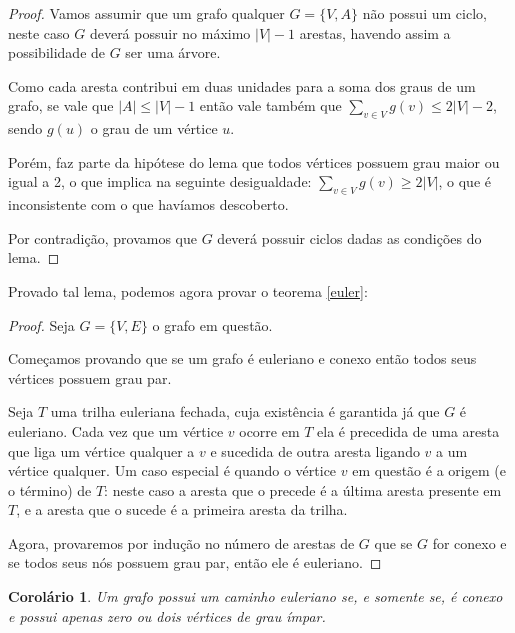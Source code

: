 \documentclass{article}
\newtheorem{corollary}{Corolário}
\begin{document}
\begin{proof}
	Vamos assumir que um grafo qualquer $G = \{V, A\}$ não possui um ciclo, neste caso $G$ deverá possuir no máximo $|V| - 1$ arestas, havendo assim a possibilidade de $G$ ser uma árvore. 
	
	Como cada aresta contribui em duas unidades para a soma dos graus de um grafo, se vale que $|A| \leq |V|-1$ então vale também que $\sum_{v \in V} g(v) \leq 2|V| - 2$, sendo $g(u)$ o grau de um vértice $u$. 

	Porém, faz parte da hipótese do lema que todos vértices possuem grau maior ou igual a 2, o que implica na seguinte desigualdade: $\sum_{v \in V}g(v) \geq 2|V|$, o que é inconsistente com o que havíamos descoberto.
	
	Por contradição, provamos que $G$ deverá possuir ciclos dadas as condições do lema.
\end{proof}


Provado tal lema, podemos agora provar o teorema \ref{euler}:

\begin{proof}

Seja $G = \{V, E\}$ o grafo em questão.

Começamos provando que se um grafo é euleriano e conexo então todos seus vértices possuem grau par.

Seja $T$ uma trilha euleriana fechada, cuja existência é garantida já que $G$ é euleriano. Cada vez que um vértice $v$ ocorre em $T$ ela é precedida de uma aresta que liga um vértice qualquer a $v$ e sucedida de outra aresta ligando $v$ a um vértice qualquer. 
Um caso especial é quando o vértice $v$ em questão é a origem (e o término) de $T$: neste caso a aresta que o precede é a última aresta presente em $T$, e a aresta que o sucede é a primeira aresta da trilha.


Agora, provaremos por indução no número de arestas de $G$ que se $G$ for conexo e se todos seus nós possuem grau par, então ele é euleriano.


\end{proof}

\begin{corollary}
    Um grafo possui um caminho euleriano se, e somente se, é conexo e possui apenas zero ou dois vértices de grau ímpar.
\end{corollary}
\end{document}
